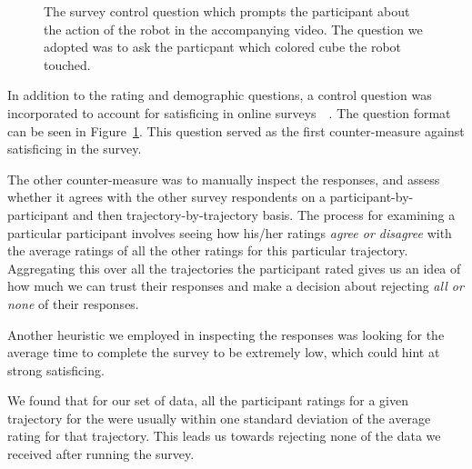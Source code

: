 \documentclass[letterpaper, 10 pt, conference]{ieeeconf}  %
\begin{document}
\begin{figure}
\caption{The survey control question which prompts the participant about the action of the robot in the accompanying video. The question we adopted was to ask the particpant which colored cube the robot touched.}
\label{fig:control_question}
\end{figure}

In addition to the rating and demographic questions, a control question was incorporated to account for satisficing in online surveys~\cite{krosnick1991response}~\cite{krosnick1996satisficing}. The question format can be seen in Figure~\ref{fig:control_question}. This question served as the first counter-measure against satisficing in the survey. 

The other counter-measure was to manually inspect the responses, and assess whether it agrees with the other survey respondents on a participant-by-participant and then trajectory-by-trajectory basis. The process for examining a particular participant involves seeing how his/her ratings {\em agree or disagree} with the average ratings of all the other ratings for this particular trajectory. Aggregating this over all the trajectories the participant rated gives us an idea of how much we can trust their responses and make a decision about rejecting {\em all or none} of their responses. 

Another heuristic we employed in inspecting the responses was looking for the average time to complete the survey to be extremely low, which could hint at strong satisficing.

We found that for our set of data, all the participant ratings for a given trajectory for the were usually within one standard deviation of the average rating for that trajectory. This leads us towards rejecting none of the data we received after running the survey.
\end{document}
